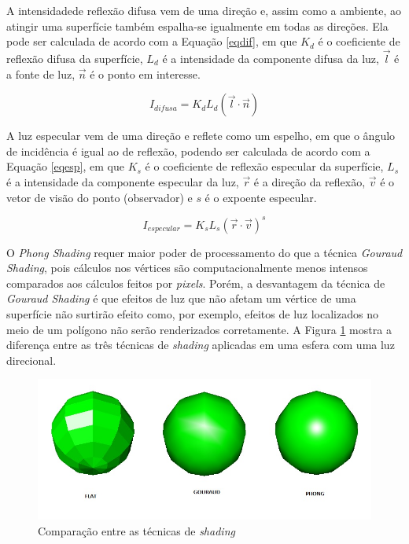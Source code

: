 {	A intensidadede reflexão difusa vem de uma direção e, assim como a ambiente, ao atingir uma superfície também espalha-se igualmente em todas as direções. Ela pode ser calculada de acordo com a Equação \ref{eqdif}, em que $K_ {d}$ é o coeficiente de reflexão difusa da superfície, $L_ {d}$ é a intensidade da componente difusa da luz, $\overrightarrow{ l}$ é a fonte de luz, $\overrightarrow{ n}$ é o ponto em interesse.

	\begin{equation}
		I_ {difusa} = K_ {d}L_ {d}( \overrightarrow{ l} \cdot \overrightarrow{ n}) 
	\label{eqdif}
	\end{equation}

	 A luz especular vem de uma direção e reflete como um espelho, em que o ângulo de incidência é igual ao de reflexão, podendo ser calculada de acordo com a Equação \ref{eqesp}, em que $K_ {s}$ é o coeficiente de reflexão especular da superfície, $L_ {s}$ é a intensidade da componente especular da luz, $\overrightarrow{ r}$ é a direção da reflexão, $\overrightarrow{v}$ é o vetor de visão do ponto (observador) e $s$ é o expoente especular.

	\begin{equation}
		I_ {especular} =K_ {s}L_ {s} (\overrightarrow{ r} \cdot \overrightarrow{ v})^s
	\label{eqesp}
	\end{equation}

	 O \textit{Phong Shading} requer maior poder de processamento do que a técnica \textit{Gouraud Shading}, pois cálculos nos vértices são computacionalmente menos intensos comparados aos cálculos feitos por \textit{pixels}. Porém, a desvantagem da técnica de \textit{Gouraud Shading} é que efeitos de luz que não afetam um vértice de uma superfície não surtirão efeito como, por exemplo, efeitos de luz localizados no meio de um polígono não serão renderizados corretamente. A Figura \ref{fgp} mostra a diferença entre as três técnicas de \textit{shading} aplicadas em uma esfera com uma luz direcional. 

	\begin{figure}[ht]
	\centering
		\includegraphics[keepaspectratio=true,scale=0.5]{figuras/flatgp.jpg}
	\caption{Comparação entre as técnicas de \textit{shading}}
	\label{fgp}
	\end{figure}

}
